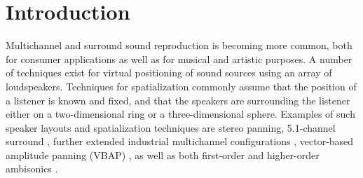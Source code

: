 \documentclass[twoside,10pt]{article}
\title{\papertitle}
\begin{document}
    
\maketitle




%
%




\begin{abstract}
Most common techniques for spatialization require the listener to be positioned at a sweet-spot, surrounded by loudspeakers. For practical concert, stage and installation applications such layouts might be inconvenient. Distance-Based Amplitude Panning (DBAP) offers an alternative panning-based spatialization method where no assumptions are made concerning the layout of the speaker array nor the position of the listener.  DBAP is implemented as C/C++ externals for Max/MSP, and as a module for the Jamoma framework.
\end{abstract}








%
%


\section{Introduction}\label{sec:introduction}

Multichannel and surround sound reproduction is becoming more common, both for consumer applications as well as for musical and artistic purposes. A number of techniques exist for virtual positioning of sound sources using an array of loudspeakers.  Techniques for spatialization commonly assume that the position of a listener is known and fixed, and that the speakers are surrounding the listener either on a two-dimensional ring or a three-dimensional sphere. Examples of such speaker layouts and spatialization techniques are stereo panning, 5.1-channel surround \cite{ITU:1993_surround_5:1}, further extended industrial multichannel configurations \cite{Rumsey:2001spatial_audio}, vector-based amplitude panning (VBAP) \cite{Pulkki:1997vbap}, as well as both first-order and higher-order ambisonics \cite{Gerzon:1974surround, Poletti:2000holographic_sound}.
\end{document}

